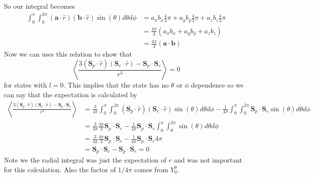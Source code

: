 \documentclass[11pt]{article}
\numberwithin{equation}{section}
\begin{document}
So our integral becomes
\begin{align*}
\int_{0}^{\pi}\int_{0}^{2\pi}(\mathbf{a}\cdot\hat{r})(\mathbf{b}\cdot\hat{r})\sin(\theta)d\theta d\phi &= a_xb_x\frac{4}{3}\pi + a_yb_y\frac{4}{3}\pi + a_zb_z\frac{4}{3}\pi\\
&= \frac{4\pi}{3}\left(a_xb_x+ a_yb_y+ a_zb_z\right)\\
&= \frac{4\pi}{3}\left(\mathbf{a}\cdot\mathbf{b}\right)
\end{align*}
Now we can uses this relation to show that
$$\left\langle \frac{3(\mathbf{S}_p\cdot\hat{r})(\mathbf{S}_e\cdot\hat{r}) - \mathbf{S}_p\cdot\mathbf{S}_e}{r^3}\right\rangle = 0$$
for states with $l=0$. This implies that the state has no $\theta$ or $\phi$ dependence so we can say that the expectation is calculated by
\begin{align*}
\left\langle \frac{3(\mathbf{S}_p\cdot\hat{r})(\mathbf{S}_e\cdot\hat{r}) - \mathbf{S}_p\cdot\mathbf{S}_e}{r^3}\right\rangle &= \frac{3}{4\pi}\int_{0}^{\pi}\int_{0}^{2\pi}(\mathbf{S}_p\cdot\hat{r})(\mathbf{S}_e\cdot\hat{r})\sin(\theta)d\theta d\phi - \frac{1}{4\pi}\int_{0}^{\pi}\int_{0}^{2\pi}\mathbf{S}_p\cdot\mathbf{S}_e\sin(\theta)d\theta d\phi\\
&= \frac{3}{4\pi}\frac{4\pi}{3}\mathbf{S}_p\cdot\mathbf{S}_e - \frac{1}{4\pi}\mathbf{S}_p\cdot\mathbf{S}_e\int_{0}^{\pi}\int_{0}^{2\pi}\sin(\theta)d\theta d\phi\\
&= \frac{3}{4\pi}\frac{4\pi}{3}\mathbf{S}_p\cdot\mathbf{S}_e - \frac{1}{4\pi}\mathbf{S}_p\cdot\mathbf{S}_e4\pi\\
&= \mathbf{S}_p\cdot\mathbf{S}_e - \mathbf{S}_p\cdot\mathbf{S}_e = 0
\end{align*}
Note we the radial integral was just the expectation of $r$ and was not important for this calculation. Also the factor of $1/4\pi$ comes from $Y_{0}^{0}$.
\end{document}
